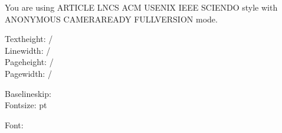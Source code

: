 
\begin{minipage}{\textwidth}
\ifnum{}
You are using \ifnum{} ARTICLE \fi\ifnum{} LNCS \fi
\ifnum{} ACM \fi\ifnum{} USENIX\fi\ifnum{} IEEE \fi
\ifnum{} SCIENDO \fi style with
\ifnum{} ANONYMOUS \fi\ifnum{} CAMERAREADY \fi
\ifnum{} FULLVERSION \fi mode.


\noindent Textheight: \printlength{\textheight} / \printlength{\textheight}\\
Linewidth: \printlength{\linewidth}/\printlength{\linewidth}\\
\noindent Pageheight: \printlength{\pdfpageheight}/\printlength{\pdfpageheight}\\
Pagewidth: \printlength{\pdfpagewidth}/\printlength{\pdfpagewidth}




\noindent Baselineskip: \printlength{\baselineskip}\\
\makeatletter
Fontsize: \f@size pt
\makeatother




\noindent Font: \fontname\font
\end{minipage}

\clearpage
